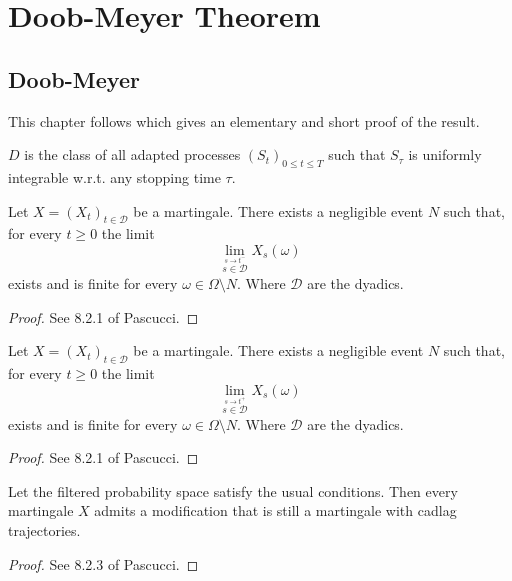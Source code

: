 \chapter{Doob-Meyer Theorem}
\label{chap:doob_meyer}


\section{Doob-Meyer}

This chapter follows \cite{Beiglböck_Schachermayer_Veliyev_2012}
which gives an elementary and short proof of the result.
\begin{definition}\label{def:Doob_Meyer_class}
$D$ is the class of all adapted processes $(S_t )_{0\leq t\leq T}$ such that $S_\tau$ is uniformly integrable w.r.t. any stopping time $\tau$.
\end{definition}

\begin{lemma}\label{lem:martingale_exists_dyadic_limit_left}
  Let $X=(X_t)_{t\in\mathcal{D}}$ be a martingale. There exists a negligible event $N$ such that, for every $t\geq 0$ the limit
  $$
  \lim_{\stackrel{s\rightarrow t^-}{s\in\mathcal{D}}}X_s(\omega)
  $$
  exists and is finite for every $\omega\in\Omega\setminus N$. Where $\mathcal{D}$ are the dyadics.
\end{lemma}
\begin{proof}
  See 8.2.1 of Pascucci.
\end{proof}

\begin{lemma}\label{lem:martingale_exists_dyadic_limit_right}
  Let $X=(X_t)_{t\in\mathcal{D}}$ be a martingale. There exists a negligible event $N$ such that, for every $t\geq 0$ the limit
  $$
  \lim_{\stackrel{s\rightarrow t^+}{s\in\mathcal{D}}}X_s(\omega)
  $$
  exists and is finite for every $\omega\in\Omega\setminus N$. Where $\mathcal{D}$ are the dyadics.
\end{lemma}
\begin{proof}
  See 8.2.1 of Pascucci.
\end{proof}

\begin{lemma}\label{lem:mg_is_cadlag}
  Let the filtered probability space satisfy the usual conditions.
  Then every martingale $X$ admits a modification that is still a martingale with cadlag trajectories.
\end{lemma}
\begin{proof}
  See 8.2.3 of Pascucci.
\end{proof}

